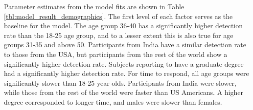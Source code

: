 \documentclass[10pt]{article}\usepackage[]{graphicx}\usepackage[]{color}
\begin{document}
Parameter estimates from the model fits are shown in Table \ref{tbl:model_result_demographics}. The first level of each factor serves as the baseline for the model. The age group 36-40  has a significantly higher detection rate than the 18-25 age group, and to a lesser extent this is also true for age groups 31-35 and above 50. Participants from India have a similar detection rate to those from the USA, but participants from the rest of the world show a significantly higher detection rate. Subjects  reporting to have  a graduate degree had a significantly higher detection rate. For time to respond, all age groups were significantly slower than  18-25 year olds.  Participants from India were slower, while those from the rest of the world were faster than US Americans. A higher degree corresponded to longer time, and males were slower than females.
\end{document}
